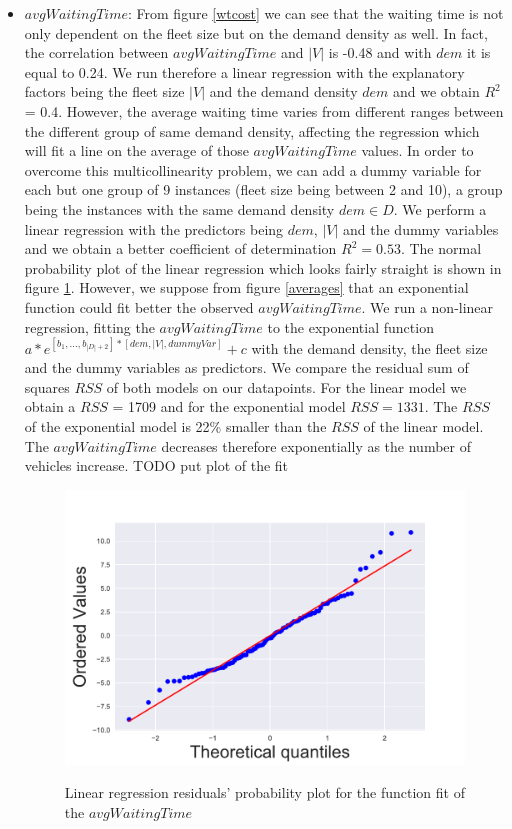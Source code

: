 \documentclass[12pt,a4paper]{article}
\begin{document}
\begin{itemize}
\item $avgWaitingTime$: From figure \ref{wtcost} we can see that the waiting time is not only dependent on the fleet size but on the demand density as well. In fact, the correlation between $avgWaitingTime$ and $|V|$ is -0.48 and with $dem$ it is equal to 0.24. We run therefore a linear regression with the explanatory factors being the fleet size $|V|$ and the demand density $dem$ and we obtain $R^{2}$ = 0.4. However, the average waiting time varies from different ranges between the different group of same demand density, affecting the regression which will fit a line on the average of those $avgWaitingTime$ values. In order to overcome this multicollinearity problem, we can add a dummy variable for each but one group of 9 instances (fleet size being between 2 and 10), a group being the instances with the same demand density $dem \in D$. We perform a linear regression with the predictors being $dem$, $|V|$ and the dummy variables and we obtain a better coefficient of determination $R^{2} = 0.53$. The normal probability plot of the linear regression which looks fairly straight is shown in figure \ref{probaplot}. However, we suppose from figure \ref{averages} that an exponential function could fit better the observed $avgWaitingTime$. We run a non-linear regression, fitting the $avgWaitingTime$ to the exponential function $a * e^{[b_{1},...,b_{|D|+2}]*[dem,|V|,dummyVar]}+c$ with the demand density, the fleet size and the dummy variables as predictors. We compare the residual sum of squares $RSS$ of both models on our datapoints. For the linear model we obtain a $RSS$ =   1709 and for the exponential model $RSS = 1331$. The $RSS$ of the exponential model is 22\% smaller than the $RSS$ of the linear model. The $avgWaitingTime$ decreases therefore exponentially as the number of vehicles increase.
TODO put plot of the fit
\begin{figure}[h] 
  \centering
  \caption{Linear regression residuals' probability plot for the function fit of the $avgWaitingTime$}
\includegraphics[scale=0.4]{./images/probaplot.pdf}
\label{probaplot}
\end{figure}


\end{itemize}
\end{document}
